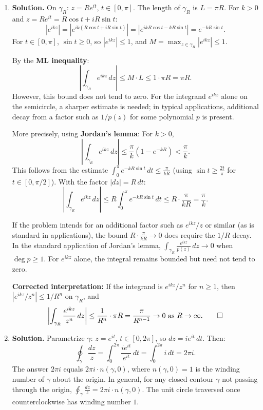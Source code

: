 \begin{enumerate}
One can also verify directly: $z^2$ has antiderivative $F(z) = z^3/3$, so the integral over any closed curve vanishes.

\item \textbf{Solution.}
On $\gamma_R$: $z = Re^{it}$, $t \in [0,\pi]$. The length of $\gamma_R$ is $L = \pi R$. For $k > 0$ and $z = Re^{it} = R\cos t + iR\sin t$:
\[
|e^{ikz}| = |e^{ik(R\cos t + iR\sin t)}| = |e^{ikR\cos t - kR\sin t}| = e^{-kR\sin t}.
\]
For $t \in [0,\pi]$, $\sin t \geq 0$, so $|e^{ikz}| \leq 1$, and $M = \max_{z \in \gamma_R}|e^{ikz}| \leq 1$.

By the \textbf{ML inequality}:
\[
\left|\int_{\gamma_R} e^{ikz}\,dz\right| \leq M \cdot L \leq 1 \cdot \pi R = \pi R.
\]
However, this bound does not tend to zero. For the integrand $e^{ikz}$ alone on the semicircle, a sharper estimate is needed; in typical applications, additional decay from a factor such as $1/p(z)$ for some polynomial $p$ is present.

More precisely, using \textbf{Jordan's lemma}: For $k > 0$,
\[
\left|\int_{\gamma_R} e^{ikz}\,dz\right| \leq \frac{\pi}{k}\left(1 - e^{-kR}\right) < \frac{\pi}{k}.
\]
This follows from the estimate $\int_0^\pi e^{-kR\sin t}\,dt \leq \frac{\pi}{kR}$ (using $\sin t \geq \frac{2t}{\pi}$ for $t \in [0,\pi/2]$). With the factor $|dz| = R\,dt$:
\[
\left|\int_{\gamma_R} e^{ikz}\,dz\right| \leq R\int_0^\pi e^{-kR\sin t}\,dt \leq R \cdot \frac{\pi}{kR} = \frac{\pi}{k}.
\]

If the problem intends for an additional factor such as $e^{ikz}/z$ or similar (as is standard in applications), the bound $R \cdot \frac{\pi}{kR} \to 0$ does require the $1/R$ decay. In the standard application of Jordan's lemma, $\int_{\gamma_R} \frac{e^{ikz}}{p(z)}\,dz \to 0$ when $\deg p \geq 1$. For $e^{ikz}$ alone, the integral remains bounded but need not tend to zero.

\textbf{Corrected interpretation:} If the integrand is $e^{ikz}/z^n$ for $n \geq 1$, then $|e^{ikz}/z^n| \leq 1/R^n$ on $\gamma_R$, and
\[
\left|\int_{\gamma_R} \frac{e^{ikz}}{z^n}\,dz\right| \leq \frac{1}{R^n} \cdot \pi R = \frac{\pi}{R^{n-1}} \to 0 \text{ as } R \to \infty. \qed
\]

\item \textbf{Solution.}
Parametrize $\gamma$: $z = e^{it}$, $t \in [0, 2\pi]$, so $dz = ie^{it}\,dt$. Then:
\[
\oint_\gamma \frac{dz}{z} = \int_0^{2\pi} \frac{ie^{it}}{e^{it}}\,dt = \int_0^{2\pi} i\,dt = 2\pi i.
\]
The answer $2\pi i$ equals $2\pi i \cdot n(\gamma, 0)$, where $n(\gamma, 0) = 1$ is the winding number of $\gamma$ about the origin. In general, for any closed contour $\gamma$ not passing through the origin, $\oint_\gamma \frac{dz}{z} = 2\pi i \cdot n(\gamma, 0)$. The unit circle traversed once counterclockwise has winding number $1$.


\end{enumerate}
